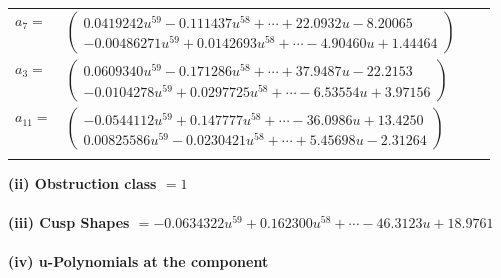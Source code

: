 \documentclass[1p]{elsarticle_modified}
\theoremstyle{definition}
\begin{document}
\begin{tabular}{m{7pt} m{180pt} m{7pt} m{180pt} }
\flushright $a_{7}=$&$\begin{pmatrix}0.0419242 u^{59}-0.111437 u^{58}+\cdots+22.0932 u-8.20065\\-0.00486271 u^{59}+0.0142693 u^{58}+\cdots-4.90460 u+1.44464\end{pmatrix}$ \\
\flushright $a_{3}=$&$\begin{pmatrix}0.0609340 u^{59}-0.171286 u^{58}+\cdots+37.9487 u-22.2153\\-0.0104278 u^{59}+0.0297725 u^{58}+\cdots-6.53554 u+3.97156\end{pmatrix}$ \\
\flushright $a_{11}=$&$\begin{pmatrix}-0.0544112 u^{59}+0.147777 u^{58}+\cdots-36.0986 u+13.4250\\0.00825586 u^{59}-0.0230421 u^{58}+\cdots+5.45698 u-2.31264\end{pmatrix}$\\&\end{tabular}
\flushleft \textbf{(ii) Obstruction class $= 1$}\\~\\
\flushleft \textbf{(iii) Cusp Shapes $= -0.0634322 u^{59}+0.162300 u^{58}+\cdots-46.3123 u+18.9761$}\\~\\
\newpage\renewcommand{\arraystretch}{1}
\flushleft \textbf{(iv) u-Polynomials at the component}\newline \\
\end{document}
